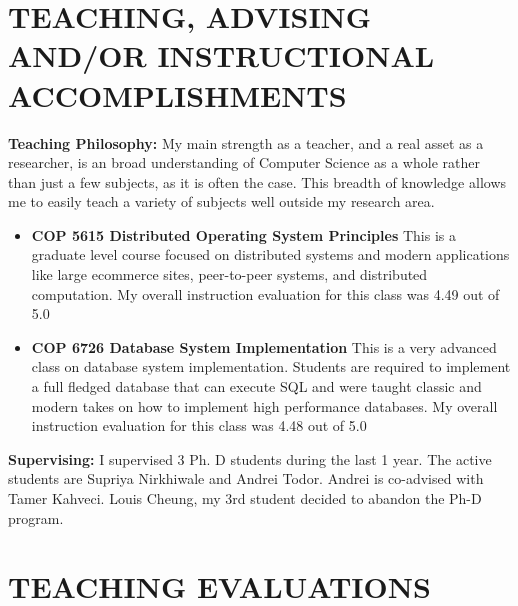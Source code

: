 \documentclass{article}
\begin{document}



\section{TEACHING, ADVISING AND/OR INSTRUCTIONAL ACCOMPLISHMENTS}

\textbf{Teaching Philosophy:} My main strength as a teacher, and a 
real asset as a researcher, is an broad understanding of Computer
Science as a whole rather than just a few subjects, as it is often the
case. This breadth of knowledge allows me to easily teach a variety of
subjects well outside my research area. 

\begin{itemize}
\item \textbf{COP 5615 Distributed Operating System Principles} This
  is a graduate level course focused on distributed systems and modern
  applications like large ecommerce sites, peer-to-peer systems, and
  distributed computation. My overall instruction evaluation for this class was 4.49 out of 5.0
\item \textbf{COP 6726 Database System Implementation} This is a very
  advanced class on database system implementation. Students are
  required to implement a full fledged database that can execute SQL
  and were taught classic and modern takes on how to implement high
  performance databases.  My overall instruction evaluation for this class was 4.48 out of 5.0
\end{itemize}

\textbf{Supervising:} I supervised 3 Ph. D students during the last 1
year.  The active students are Supriya Nirkhiwale and Andrei
Todor. Andrei is co-advised with Tamer Kahveci. Louis Cheung, my 3rd
student decided to abandon the Ph-D program.

\section{TEACHING EVALUATIONS}
\end{document}
